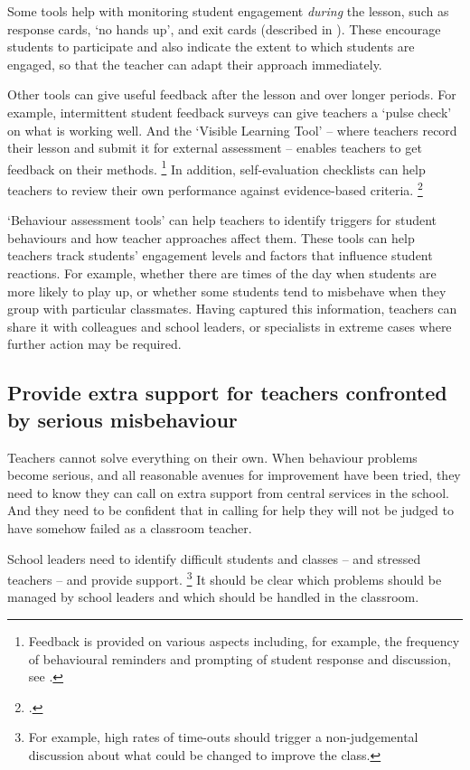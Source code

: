 \documentclass[FrontPage]{grattan}
\begin{document}
Some tools help with monitoring student engagement \emph{during} the lesson, such as response cards, `no hands up’, and exit cards (described in ). These encourage students to participate and also indicate the extent to which students are engaged, so that the teacher can adapt their approach immediately.
 
Other tools can give useful feedback after the lesson and over longer periods. For example, intermittent student feedback surveys can give teachers a `pulse check’ on what is working well. And the `Visible Learning Tool’ -- where teachers record their lesson and submit it for external assessment -- enables teachers to get feedback on their methods.%
    \footnote{Feedback is provided on various aspects including, for example, the frequency of behavioural reminders and prompting of student response and discussion, see \emph{\textcite{VisibleClassroom2015}}.} 
In addition, self-evaluation checklists can help teachers to review their own performance against evidence-based criteria.%
    \footcite{Simonsen2008EvidenceBasedPractices}

`Behaviour assessment tools' can help teachers to identify triggers for student behaviours and how teacher approaches affect them. These tools can help teachers track students’ engagement levels and factors that influence student reactions. For example, whether there are times of the day when students are more likely to play up, or whether some students tend to misbehave when they group with particular classmates. Having captured this information, teachers can share it with colleagues and school leaders, or specialists in extreme cases where further action may be required.

\subsection{Provide extra support for teachers confronted by serious misbehaviour}\label{subsubsec:provide-extra-support}
Teachers cannot solve everything on their own. When behaviour problems become serious, and all reasonable avenues for improvement have been tried, they need to know they can call on extra support from central services in the school. And they need to be confident that in calling for help they will not be judged to have somehow failed as a classroom teacher.

School leaders need to identify difficult students and classes -- and stressed teachers -- and provide support.%
    \footnote{For example, high rates of time-outs should trigger a non-judgemental discussion about what could be changed to improve the class.}
It should be clear which problems should be managed by school leaders and which should be handled in the classroom. 
\end{document}
